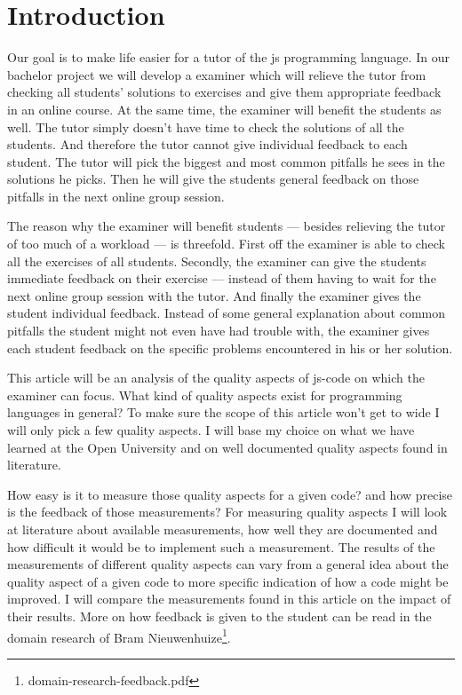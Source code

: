 \section{Introduction} 

Our goal is to make life easier for a tutor
of the \gls{js} programming language.
In our bachelor project we will develop a \gls{examiner}
which will relieve the \gls{tutor} from checking
all \glspl{student}' \glspl{solution} to \glspl{exercise}
and give them appropriate feedback in an online course.
At the same time, the \gls{examiner} will benefit the \glspl{student} as well.
The \gls{tutor} simply doesn't have time
to check the \glspl{solution} of all the \glspl{student}.
And therefore the \gls{tutor} cannot give individual \gls{feedback}
to each \gls{student}.
The \gls{tutor} will pick the biggest and most common pitfalls he sees
in the \glspl{solution} he picks.
Then he will give the \glspl{student} general feedback on those pitfalls
in the next online group session.

The reason why the \gls{examiner} will benefit \glspl{student} --- besides
relieving the \gls{tutor} of too much of a workload --- is threefold.
First off the \gls{examiner} is able
to check all the \glspl{exercise} of all \glspl{student}.
Secondly, the \gls{examiner} can give the \glspl{student}
immediate \gls{feedback} on their \gls{exercise} ---
instead of them having to wait for
the next online group session with the \gls{tutor}.
And finally the \gls{examiner} gives the \gls{student}
individual \gls{feedback}.
Instead of some general explanation
about common pitfalls the \gls{student} might not even have had trouble with,
the \gls{examiner} gives each \gls{student} \gls{feedback}
on the specific problems encountered in his or her \gls{solution}.

This article will be an analysis of the quality aspects of \gls{js-code}
on which the \gls{examiner} can focus.
What kind of quality aspects exist for programming languages in general?
To make sure the scope of this article won't get to wide
I will only pick a few quality aspects.
I will base my choice on what we have learned at the Open University
and on well documented quality aspects found in literature.

How easy is it to measure those quality aspects for a given \gls{code}?
and how precise is the \gls{feedback} of those measurements?
For measuring quality aspects
I will look at literature about available measurements,
how well they are documented
and how difficult it would be to implement such a measurement.
The results of the measurements of different quality aspects can vary from
a general idea about the quality aspect of a given \gls{code}
to more specific indication of how a \gls{code} might be improved.
I will compare the measurements found in this article
on the impact of their results.
More on how \gls{feedback} is given to the student
can be read in the domain research of
Bram Nieuwenhuize\footnote{domain-research-feedback.pdf}.

